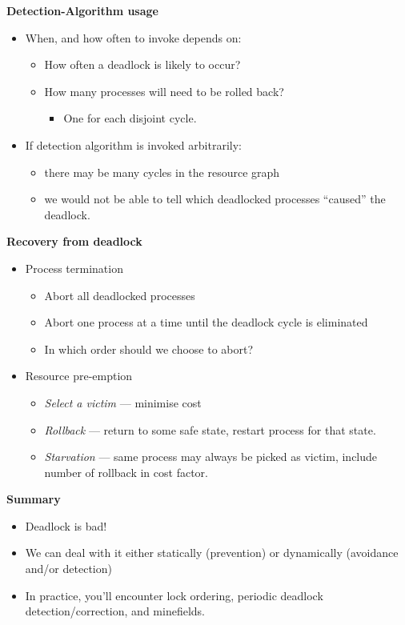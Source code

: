 \documentclass[11pt,a4paper]{article}
\begin{document}
\textbf{Detection-Algorithm usage}
\begin{itemize}
    \item When, and how often to invoke depends on:
        \begin{itemize}
            \item How often a deadlock is likely to occur?
            \item How many processes will need to be rolled back?
                \begin{itemize}
                    \item One for each disjoint cycle.
                \end{itemize}
        \end{itemize}
    \item If detection algorithm is invoked arbitrarily:
        \begin{itemize}
            \item there may be many cycles in the resource graph
            \item we would not be able to tell which deadlocked processes ``caused'' the
                deadlock.
        \end{itemize}
\end{itemize}

\textbf{Recovery from deadlock}
\begin{itemize}
    \item Process termination
        \begin{itemize}
            \item Abort all deadlocked processes
            \item Abort one process at a time until the deadlock cycle is eliminated
            \item In which order should we choose to abort?
        \end{itemize}
    \item Resource pre-emption
        \begin{itemize}
            \item \emph{Select a victim} --- minimise cost
            \item \emph{Rollback} --- return to some safe state,
                restart process for that state.
            \item \emph{Starvation} --- same process may always be picked as victim,
                include number of rollback in cost factor.
        \end{itemize}
\end{itemize}

\textbf{Summary}
\begin{itemize}
    \item Deadlock is bad!
    \item We can deal with it either statically (prevention)
        or dynamically (avoidance and/or detection)
    \item In practice, you'll encounter lock ordering, periodic deadlock detection/correction,
        and minefields.
\end{itemize}
\end{document}
